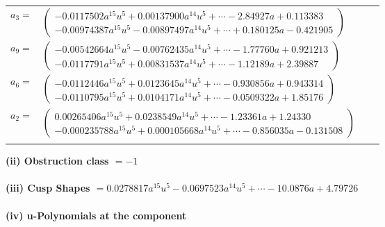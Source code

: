 \documentclass[1p]{elsarticle_modified}
\theoremstyle{definition}
\begin{document}
\begin{tabular}{m{7pt} m{180pt} m{7pt} m{180pt} }
\flushright $a_{3}=$&$\begin{pmatrix}-0.0117502 a^{15} u^{5}+0.00137900 a^{14} u^{5}+\cdots-2.84927 a+0.113383\\-0.00974387 a^{15} u^{5}-0.00897497 a^{14} u^{5}+\cdots+0.180125 a-0.421905\end{pmatrix}$ \\
\flushright $a_{9}=$&$\begin{pmatrix}-0.00542664 a^{15} u^{5}-0.00762435 a^{14} u^{5}+\cdots-1.77760 a+0.921213\\-0.0117791 a^{15} u^{5}+0.00831537 a^{14} u^{5}+\cdots-1.12189 a+2.39887\end{pmatrix}$ \\
\flushright $a_{6}=$&$\begin{pmatrix}-0.0112446 a^{15} u^{5}+0.0123645 a^{14} u^{5}+\cdots-0.930856 a+0.943314\\-0.0110795 a^{15} u^{5}+0.0104171 a^{14} u^{5}+\cdots-0.0509322 a+1.85176\end{pmatrix}$ \\
\flushright $a_{2}=$&$\begin{pmatrix}0.00265406 a^{15} u^{5}+0.0238549 a^{14} u^{5}+\cdots-1.23361 a+1.24330\\-0.000235788 a^{15} u^{5}+0.000105668 a^{14} u^{5}+\cdots-0.856035 a-0.131508\end{pmatrix}$\\&\end{tabular}
\flushleft \textbf{(ii) Obstruction class $= -1$}\\~\\
\flushleft \textbf{(iii) Cusp Shapes $= 0.0278817 a^{15} u^{5}-0.0697523 a^{14} u^{5}+\cdots-10.0876 a+4.79726$}\\~\\
\newpage\renewcommand{\arraystretch}{1}
\flushleft \textbf{(iv) u-Polynomials at the component}\newline \\
\end{document}
